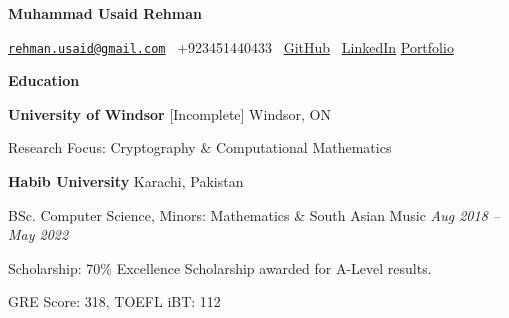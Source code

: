 \documentclass[12pt, a4paper]{article}
\begin{document}
{}\selectfont

\begin{center}
	\Large\textbf{Muhammad Usaid Rehman}\\
	\hrulefill
\end{center}

\begin{center}
	\href{mailto:rehman.usaid@gmail.com}{\texttt{rehman.usaid@gmail.com}} \textbullet \ +923451440433 \textbullet \ \href{https://github.com/m-usaid99}{GitHub} \textbullet \ \href{https://www.linkedin.com/in/muhammad-usaid-rehman-aa8b64202/}{LinkedIn} \textbullet \href{https://musaid-rehman.vercel.app}{Portfolio}
\end{center}

\begin{center}
	\large\textbf{Education}
\end{center}

\textbf{University of Windsor} [Incomplete] \hfill Windsor, ON


Research Focus: Cryptography \& Computational Mathematics



\vspace{12pt}
\textbf{Habib University} \hfill Karachi, Pakistan

BSc. Computer Science, Minors: Mathematics \& South Asian Music \hfill \textit{Aug 2018 -- May 2022}

Scholarship: 70\% Excellence Scholarship awarded for A-Level results.


GRE Score: 318, TOEFL iBT: 112
\end{document}
